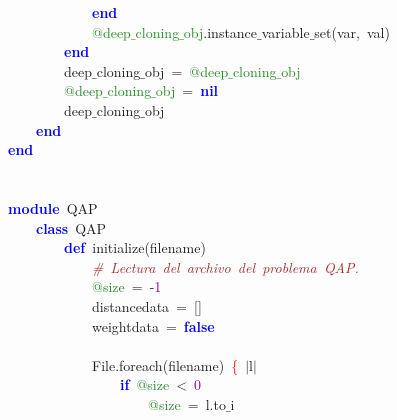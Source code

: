 \mbox{}\ \ \ \ \ \ \ \ \ \ \ \ \textbf{\textcolor{Blue}{end}} \\
\mbox{}\ \ \ \ \ \ \ \ \ \ \ \ \textcolor{ForestGreen}{@deep$\_$cloning$\_$obj}\textcolor{BrickRed}{.}instance$\_$variable$\_$set\textcolor{BrickRed}{(}var\textcolor{BrickRed}{,}\ val\textcolor{BrickRed}{)} \\
\mbox{}\ \ \ \ \ \ \ \ \textbf{\textcolor{Blue}{end}} \\
\mbox{}\ \ \ \ \ \ \ \ deep$\_$cloning$\_$obj\ \textcolor{BrickRed}{=}\ \textcolor{ForestGreen}{@deep$\_$cloning$\_$obj} \\
\mbox{}\ \ \ \ \ \ \ \ \textcolor{ForestGreen}{@deep$\_$cloning$\_$obj}\ \textcolor{BrickRed}{=}\ \textbf{\textcolor{Blue}{nil}} \\
\mbox{}\ \ \ \ \ \ \ \ deep$\_$cloning$\_$obj \\
\mbox{}\ \ \ \ \textbf{\textcolor{Blue}{end}} \\
\mbox{}\textbf{\textcolor{Blue}{end}} \\
\mbox{} \\
\mbox{} \\
\mbox{}\textbf{\textcolor{Blue}{module}}\ QAP \\
\mbox{}\ \ \ \ \textbf{\textcolor{Blue}{class}}\ QAP \\
\mbox{}\ \ \ \ \ \ \ \ \textbf{\textcolor{Blue}{def}}\ initialize\textcolor{BrickRed}{(}filename\textcolor{BrickRed}{)} \\
\mbox{}\ \ \ \ \ \ \ \ \ \ \ \ \textit{\textcolor{Brown}{\#\ Lectura\ del\ archivo\ del\ problema\ QAP.}} \\
\mbox{}\ \ \ \ \ \ \ \ \ \ \ \ \textcolor{ForestGreen}{@size}\ \textcolor{BrickRed}{=}\ \textcolor{BrickRed}{-}\textcolor{Purple}{1} \\
\mbox{}\ \ \ \ \ \ \ \ \ \ \ \ distancedata\ \textcolor{BrickRed}{=}\ \textcolor{BrickRed}{[]} \\
\mbox{}\ \ \ \ \ \ \ \ \ \ \ \ weightdata\ \textcolor{BrickRed}{=}\ \textbf{\textcolor{Blue}{false}} \\
\mbox{} \\
\mbox{}\ \ \ \ \ \ \ \ \ \ \ \ File\textcolor{BrickRed}{.}foreach\textcolor{BrickRed}{(}filename\textcolor{BrickRed}{)}\ \textcolor{Red}{\{}\ \textcolor{BrickRed}{$|$}l\textcolor{BrickRed}{$|$} \\
\mbox{}\ \ \ \ \ \ \ \ \ \ \ \ \ \ \ \ \textbf{\textcolor{Blue}{if}}\ \textcolor{ForestGreen}{@size}\ \textcolor{BrickRed}{\textless{}}\ \textcolor{Purple}{0} \\
\mbox{}\ \ \ \ \ \ \ \ \ \ \ \ \ \ \ \ \ \ \ \ \textcolor{ForestGreen}{@size}\ \textcolor{BrickRed}{=}\ l\textcolor{BrickRed}{.}to$\_$i\  \\

